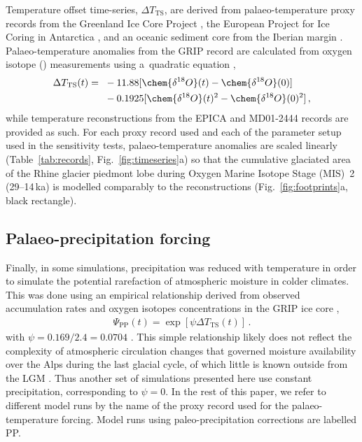 \documentclass[tc, manuscript]{copernicus}
\begin{document}
    Temperature offset time-series, ${\Delta}T_{\text{TS}}$, are derived from
    palaeo-temperature proxy records from the Greenland Ice Core Project
    \citep[GRIP;][]{Dansgaard.etal.1993}, the European Project for Ice Coring
    in Antarctica \citep[EPICA;][] {Jouzel.etal.2007}, and an oceanic sediment
    core from the Iberian margin \citep[MD01-2444;][]{Martrat.etal.2007}.
    Palaeo-temperature anomalies from the GRIP record are calculated from
    oxygen isotope () measurements using a~quadratic
    equation \citep{Johnsen.etal.1995},
    \begin{align}
      {\Delta}T_{\text{TS}}(t) ={~}&-11.88 [\chem{\delta^{18}O}(t)
                                    -\chem{\delta^{18}O}(0)] \nonumber \\
                                   &-0.1925 [\chem{\delta^{18}O}(t)^2
                                    -\chem{\delta^{18}O}(0)^2] \,,
    \end{align}
    while temperature reconstructions from the EPICA and MD01-2444 records are
    provided as such. For each proxy record used and each of the parameter
    setup used in the sensitivity tests, palaeo-temperature anomalies are
    scaled linearly (Table~\ref{tab:records}, Fig.~\ref{fig:timeseries}a) so
    that the cumulative glaciated area of the Rhine glacier piedmont lobe
    during Oxygen Marine Isotope Stage (MIS)~2 (29--14\,ka) is modelled
    comparably to the reconstructions (Fig.~\ref{fig:footprints}a, black
    rectangle).


\subsection{Palaeo-precipitation forcing}
\label{sec:palprec}

    Finally, in some simulations, precipitation was reduced with temperature in
    order to simulate the potential rarefaction of atmospheric moisture in
    colder climates. This was done using an empirical relationship derived from
    observed accumulation rates and oxygen isotopes concentrations in the GRIP
    ice core \citep{Dahl-Jensen.etal.1993},
    \begin{align}
      {\Psi}_{\text{PP}}(t) = \exp[\psi{\Delta}T_{\text{TS}}(t)] \,.
    \end{align}
    with $\psi=0.169/2.4=0.0704$ \citep{Huybrechts.2002}. This simple
    relationship likely does not reflect the complexity of atmospheric
    circulation changes that governed moisture availability over the Alps
    during the last glacial cycle, of which little is known outside from the
    LGM \citep[cf.][]{Wu.etal.2007, Strandberg.etal.2011, Ludwig.etal.2016}.
    Thus another set of simulations presented here use constant
    precipitation, corresponding to $\psi=0$. In the rest of this paper, we
    refer to different model runs by the name of the proxy record used for the
    palaeo-temperature forcing. Model runs using paleo-precipitation
    corrections are labelled PP.
\end{document}
